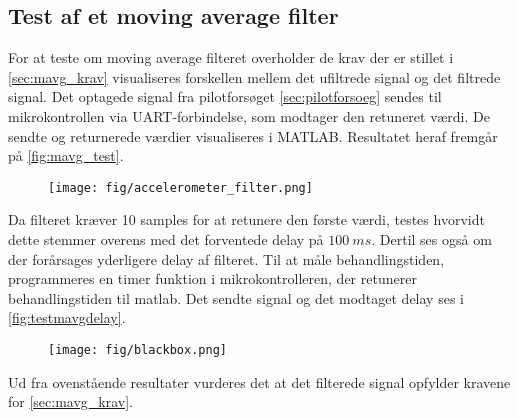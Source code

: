 \subsection{Test af et moving average filter}
For at teste om moving average filteret overholder de krav der er stillet i \autoref{sec:mavg_krav} visualiseres forskellen mellem det ufiltrede signal og det filtrede signal. Det optagede signal fra pilotforsøget \autoref{sec:pilotforsoeg} sendes til mikrokontrollen via UART-forbindelse, som modtager den retuneret værdi. De sendte og returnerede værdier visualiseres i MATLAB. Resultatet heraf fremgår på \autoref{fig:mavg_test}. 

\begin{figure}[H]
	\centering
	\texttt{[image: fig/accelerometer\_filter.png]}
	\caption{ }
	\label{fig:mavg_test}
\end{figure}


Da filteret kræver 10 samples for at retunere den første værdi, testes hvorvidt dette stemmer overens med det forventede delay på $100~ms$. Dertil ses også om der forårsages yderligere delay af filteret. Til at måle behandlingstiden, programmeres en timer funktion i mikrokontrolleren, der retunerer behandlingstiden til matlab. Det sendte signal og det modtaget delay ses i \autoref{fig:testmavgdelay}.  

\begin{figure}[H]
	\centering
	\texttt{[image: fig/blackbox.png]}
	\caption{ }
	\label{fig:testmavgdelay}
\end{figure}

Ud fra ovenstående resultater vurderes det at det filterede signal opfylder kravene for \autoref{sec:mavg_krav}. 